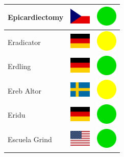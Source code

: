 \documentclass[12pt, a4paper, twoside]{report}
\begin{document}
\begin{center}
\begin{longtable}{|p{5cm}|p{2cm}|p{2cm}|}
Epicardiectomy & \includegraphics[width=1cm]{4x3/cz} & \includegraphics[width=1cm]{likes/y} \\ \hline
Eradicator & \includegraphics[width=1cm]{4x3/de} & \includegraphics[width=1cm]{likes/m} \\ \hline
Erdling & \includegraphics[width=1cm]{4x3/de} & \includegraphics[width=1cm]{likes/y} \\ \hline
Ereb Altor & \includegraphics[width=1cm]{4x3/se} & \includegraphics[width=1cm]{likes/m} \\ \hline
Eridu & \includegraphics[width=1cm]{4x3/de} & \includegraphics[width=1cm]{likes/y} \\ \hline
Escuela Grind & \includegraphics[width=1cm]{4x3/us} & \includegraphics[width=1cm]{likes/y} \\ \hline

\end{longtable}
\end{center}
\end{document}

